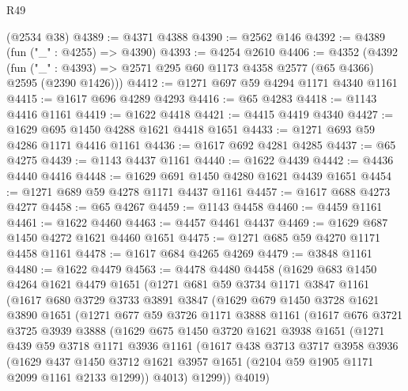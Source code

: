 \begin{lexlean}{R49}
\begin{coremodule}
    (@2534 @38)
@4389 := @4371 @4388
@4390 := @2562 @146
@4392 := @4389 (fun ("_" : @4255) => @4390)
@4393 := @4254 @2610
@4406 := @4352
    (@4392 (fun ("_" : @4393) => @2571 @295 @60 @1173 @4358 @2577 (@65 @4366) @2595 (@2390 @1426)))
@4412 := @1271 @697 @59 @4294 @1171 @4340 @1161
@4415 := @1617 @696 @4289 @4293
@4416 := @65 @4283
@4418 := @1143 @4416 @1161
@4419 := @1622 @4418
@4421 := @4415 @4419 @4340
@4427 := @1629 @695 @1450 @4288 @1621 @4418 @1651
@4433 := @1271 @693 @59 @4286 @1171 @4416 @1161
@4436 := @1617 @692 @4281 @4285
@4437 := @65 @4275
@4439 := @1143 @4437 @1161
@4440 := @1622 @4439
@4442 := @4436 @4440 @4416
@4448 := @1629 @691 @1450 @4280 @1621 @4439 @1651
@4454 := @1271 @689 @59 @4278 @1171 @4437 @1161
@4457 := @1617 @688 @4273 @4277
@4458 := @65 @4267
@4459 := @1143 @4458
@4460 := @4459 @1161
@4461 := @1622 @4460
@4463 := @4457 @4461 @4437
@4469 := @1629 @687 @1450 @4272 @1621 @4460 @1651
@4475 := @1271 @685 @59 @4270 @1171 @4458 @1161
@4478 := @1617 @684 @4265 @4269
@4479 := @3848 @1161
@4480 := @1622 @4479
@4563 := @4478
    @4480
    @4458
    (@1629
      @683
      @1450
      @4264
      @1621
      @4479
      @1651
      (@1271
        @681
        @59
        @3734
        @1171
        @3847
        @1161
        (@1617
          @680
          @3729
          @3733
          @3891
          @3847
          (@1629
            @679
            @1450
            @3728
            @1621
            @3890
            @1651
            (@1271
              @677
              @59
              @3726
              @1171
              @3888
              @1161
              (@1617
                @676
                @3721
                @3725
                @3939
                @3888
                (@1629
                  @675
                  @1450
                  @3720
                  @1621
                  @3938
                  @1651
                  (@1271
                    @439
                    @59
                    @3718
                    @1171
                    @3936
                    @1161
                    (@1617
                      @438
                      @3713
                      @3717
                      @3958
                      @3936
                      (@1629
                        @437
                        @1450
                        @3712
                        @1621
                        @3957
                        @1651
                        (@2104 @59 @1905 @1171 @2099 @1161 @2133 @1299))
                      @4013)
                    @1299))
                @4019)

\end{coremodule}
\end{lexlean}
